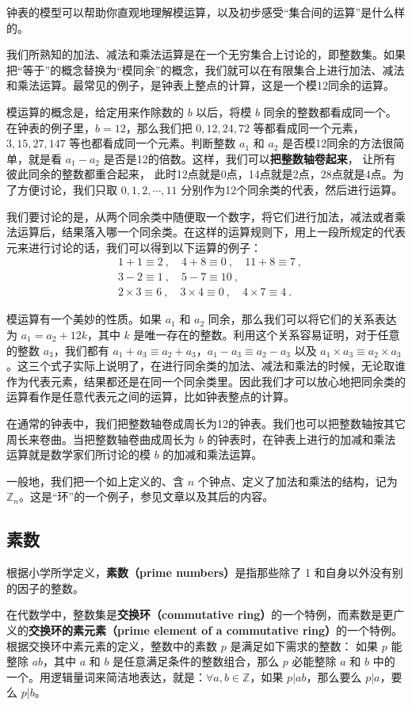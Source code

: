 钟表的模型可以帮助你直观地理解模运算，以及初步感受“集合间的运算”是什么样的。

我们所熟知的加法、减法和乘法运算是在一个无穷集合上讨论的，即整数集。如果把“等于”的概念替换为“模同余”的概念，我们就可以在有限集合上进行加法、减法和乘法运算。最常见的例子，是钟表上整点的计算，这是一个模12同余的运算。

模运算的概念是，给定用来作除数的 $b$ 以后，将模 $b$ 同余的整数都看成同一个。在钟表的例子里，$b=12$，那么我们把 $0,12,24,72$ 等都看成同一个元素，$3,15,27,147$ 等也都看成同一个元素。判断整数 $a_1$ 和 $a_2$ 是否模12同余的方法很简单，就是看 $a_1-a_2$ 是否是12的倍数。这样，我们可以\textbf{把整数轴卷起来}， 让所有彼此同余的整数都重合起来， 此时12点就是0点，14点就是2点，28点就是4点。为了方便讨论，我们只取 $0,1,2,\cdots,11$ 分别作为12个同余类的代表，然后进行运算。

我们要讨论的是，从两个同余类中随便取一个数字，将它们进行加法，减法或者乘法运算后，结果落入哪一个同余类。在这样的运算规则下，用上一段所规定的代表元来进行讨论的话，我们可以得到以下运算的例子：
\begin{equation}
\begin{aligned}
&1+1\equiv 2~, \quad 4+8\equiv 0~, \quad 11+8\equiv 7~, \\
&3-2\equiv 1~, \quad 5-7\equiv 10~, \\
&2\times 3\equiv 6~, \quad 3\times 4\equiv 0~, \quad 4\times 7\equiv 4~.
\end{aligned}
\end{equation}


模运算有一个美妙的性质。如果 $a_1$ 和 $a_2$ 同余，那么我们可以将它们的关系表达为 $a_1=a_2+12k$，其中 $k$ 是唯一存在的整数。利用这个关系容易证明，对于任意的整数 $a_3$，我们都有 $a_1+a_3\equiv a_2+a_3$，$a_1-a_3\equiv a_2-a_3$ 以及 $a_1\times a_3\equiv a_2\times a_3$。这三个式子实际上说明了，在进行同余类的加法、减法和乘法的时候，无论取谁作为代表元素，结果都还是在同一个同余类里。因此我们才可以放心地把同余类的运算看作是任意代表元之间的运算，比如钟表整点的计算。

在通常的钟表中，我们把整数轴卷成周长为12的钟表。我们也可以把整数轴按其它周长来卷曲。当把整数轴卷曲成周长为 $b$ 的钟表时，在钟表上进行的加减和乘法运算就是数学家们所讨论的模 $b$ 的加减和乘法运算。

一般地，我们把一个如上定义的、含 $n$ 个钟点、定义了加法和乘法的结构，记为 $\mathbb{Z}_n$。这是“环”的一个例子，参见文章以及其后的内容。

\subsection{素数}

根据小学所学定义，\textbf{素数（prime numbers）}是指那些除了 1 和自身以外没有别的因子的整数。

在代数学中，整数集是\textbf{交换环（commutative ring）}的一个特例，而素数是更广义的\textbf{交换环的素元素（prime element of a commutative ring）}的一个特例。根据交换环中素元素的定义，整数中的素数 $p$ 是满足如下需求的整数：
如果 $p$ 能整除 $ab$，其中 $a$ 和 $b$ 是任意满足条件的整数组合，那么 $p$ 必能整除 $a$ 和 $b$ 中的一个。用逻辑量词来简洁地表达，就是：$\forall a, b\in \mathbb{Z}$，如果 $p|ab$，那么要么 $p|a$，要么 $p|b$。 
